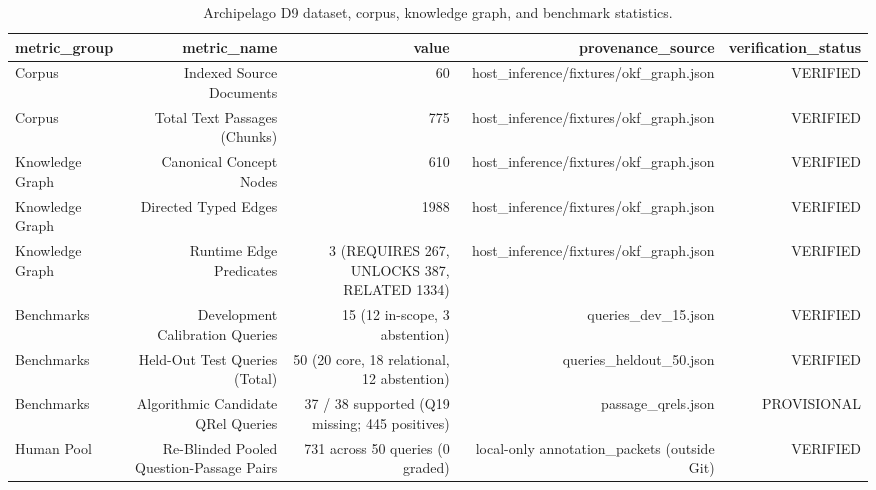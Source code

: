 \begin{table}[t]
\centering
\small
\caption{Archipelago D9 dataset, corpus, knowledge graph, and benchmark statistics.}
\label{tab:t1_dataset_stats}
\begin{tabular}{lrrrr}
\toprule
\textbf{metric\_group} & \textbf{metric\_name} & \textbf{value} & \textbf{provenance\_source} & \textbf{verification\_status} \\
\midrule
Corpus & Indexed Source Documents & 60 & host\_inference/fixtures/okf\_graph.json & VERIFIED \\
Corpus & Total Text Passages (Chunks) & 775 & host\_inference/fixtures/okf\_graph.json & VERIFIED \\
Knowledge Graph & Canonical Concept Nodes & 610 & host\_inference/fixtures/okf\_graph.json & VERIFIED \\
Knowledge Graph & Directed Typed Edges & 1988 & host\_inference/fixtures/okf\_graph.json & VERIFIED \\
Knowledge Graph & Runtime Edge Predicates & 3 (REQUIRES 267, UNLOCKS 387, RELATED 1334) & host\_inference/fixtures/okf\_graph.json & VERIFIED \\
Benchmarks & Development Calibration Queries & 15 (12 in-scope, 3 abstention) & queries\_dev\_15.json & VERIFIED \\
Benchmarks & Held-Out Test Queries (Total) & 50 (20 core, 18 relational, 12 abstention) & queries\_heldout\_50.json & VERIFIED \\
Benchmarks & Algorithmic Candidate QRel Queries & 37 / 38 supported (Q19 missing; 445 positives) & passage\_qrels.json & PROVISIONAL \\
Human Pool & Re-Blinded Pooled Question-Passage Pairs & 731 across 50 queries (0 graded) & local-only annotation\_packets (outside Git) & VERIFIED \\
\bottomrule
\end{tabular}
\end{table}
